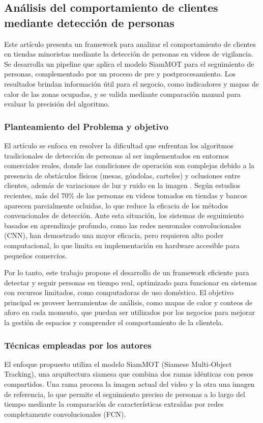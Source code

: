 \subsection{Análisis del comportamiento de clientes mediante detección de personas}

Este artículo presenta un framework para analizar el comportamiento de clientes en tiendas minoristas mediante la detección de personas en videos de vigilancia. Se desarrolla un pipeline que aplica el modelo SiamMOT para el seguimiento de personas, complementado por un proceso de pre y postprocesamiento. Los resultados brindan información útil para el negocio, como indicadores y mapas de calor de las zonas ocupadas, y se valida mediante comparación manual para evaluar la precisión del algoritmo.



\subsubsection{Planteamiento del Problema y objetivo }
El artículo se enfoca en resolver la dificultad que enfrentan los algoritmos tradicionales de detección de personas al ser implementados en entornos comerciales reales, donde las condiciones de operación son complejas debido a la presencia de obstáculos físicos (mesas, góndolas, carteles) y oclusiones entre clientes, además de variaciones de luz y ruido en la imagen . Según estudios recientes, más del 70\% de las personas en videos tomados en tiendas y bancos aparecen parcialmente ocluidas, lo que reduce la eficacia de los métodos convencionales de detección. Ante esta situación, los sistemas de seguimiento basados en aprendizaje profundo, como las redes neuronales convolucionales (CNN), han demostrado una mayor eficacia, pero requieren alto poder computacional, lo que limita su implementación en hardware accesible para pequeños comercios.

Por lo tanto, este trabajo propone el desarrollo de un framework eficiente para detectar y seguir personas en tiempo real, optimizado para funcionar en sistemas con recursos limitados, como computadoras de uso doméstico. El objetivo principal es proveer herramientas de análisis, como mapas de calor y conteos de aforo en cada momento, que puedan ser utilizados por los negocios para mejorar la gestión de espacios y comprender el comportamiento de la clientela.



\subsubsection{Técnicas empleadas por los autores}
El enfoque propuesto utiliza el modelo SiamMOT (Siamese Multi-Object Tracking), una arquitectura siamesa que combina dos ramas idénticas con pesos compartidos. Una rama procesa la imagen actual del video y la otra una imagen de referencia, lo que permite el seguimiento preciso de personas a lo largo del tiempo mediante la comparación de características extraídas por redes completamente convolucionales (FCN).

